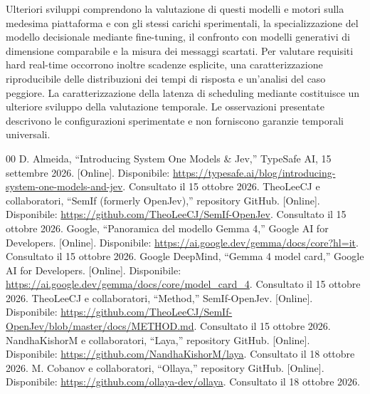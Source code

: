 \documentclass[conference]{IEEEtran}
\newcommand{\code}[1]{\texttt{\detokenize{#1}}}
\begin{document}
Ulteriori sviluppi comprendono la valutazione di questi modelli e motori sulla medesima piattaforma e con gli stessi carichi sperimentali, la specializzazione del modello decisionale mediante fine-tuning, il confronto con modelli generativi di dimensione comparabile e la misura dei messaggi scartati. Per valutare requisiti hard real-time occorrono inoltre scadenze esplicite, una caratterizzazione riproducibile delle distribuzioni dei tempi di risposta e un'analisi del caso peggiore. La caratterizzazione della latenza di scheduling mediante \code{cyclictest} costituisce un ulteriore sviluppo della valutazione temporale. Le osservazioni presentate descrivono le configurazioni sperimentate e non forniscono garanzie temporali universali.

\begin{thebibliography}{00}
 D. Almeida, ``Introducing System One Models \& Jev,'' TypeSafe AI, 15 settembre 2026. [Online]. Disponibile: \url{https://typesafe.ai/blog/introducing-system-one-models-and-jev}. Consultato il 15 ottobre 2026.
 TheoLeeCJ e collaboratori, ``SemIf (formerly OpenJev),'' repository GitHub. [Online]. Disponibile: \url{https://github.com/TheoLeeCJ/SemIf-OpenJev}. Consultato il 15 ottobre 2026.
 Google, ``Panoramica del modello Gemma 4,'' Google AI for Developers. [Online]. Disponibile: \url{https://ai.google.dev/gemma/docs/core?hl=it}. Consultato il 15 ottobre 2026.
 Google DeepMind, ``Gemma 4 model card,'' Google AI for Developers. [Online]. Disponibile: \url{https://ai.google.dev/gemma/docs/core/model_card_4}. Consultato il 15 ottobre 2026.
 TheoLeeCJ e collaboratori, ``Method,'' SemIf-OpenJev. [Online]. Disponibile: \url{https://github.com/TheoLeeCJ/SemIf-OpenJev/blob/master/docs/METHOD.md}. Consultato il 15 ottobre 2026.
 NandhaKishorM e collaboratori, ``Laya,'' repository GitHub. [Online]. Disponibile: \url{https://github.com/NandhaKishorM/laya}. Consultato il 18 ottobre 2026.
 M. Cobanov e collaboratori, ``Ollaya,'' repository GitHub. [Online]. Disponibile: \url{https://github.com/ollaya-dev/ollaya}. Consultato il 18 ottobre 2026.
\end{thebibliography}
\end{document}
